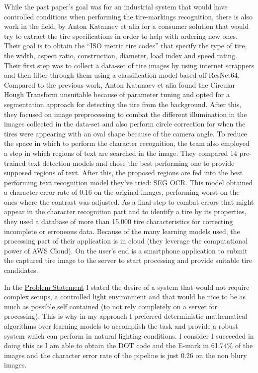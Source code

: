 While the past paper's goal was for an industrial system that would have controlled conditions when performing the tire-markings recognition, there is also work in the field, by Anton Katanaev et alia \cite{site:0} for a consumer solution that would try to extract the tire specifications in order to help with ordering new ones. Their goal is to obtain the “ISO metric tire codes” that specify the type of tire, the width, aspect ratio, construction, diameter, load index and speed rating. Their first step was to collect a data-set of tire images by using internet scrappers and then filter through them using a classification model based off ResNet64. Compared to the previous work, Anton Katanaev et alia found the Circular Hough Transform unsuitable because of parameter tuning and opted for a segmentation approach for detecting the tire from the background. After this, they focused on image preprocessing to combat the different illumination in the images collected in the data-set and also perform circle correction for when the tires were appearing with an oval shape because of the camera angle. To reduce the space in which to perform the character recognition, the team also employed a step in which regions of text are searched in the image. They compared 14 pre-trained text detection models and chose the best performing one to provide supposed regions of text. After this, the proposed regions are fed into the best performing text recognition model they've tried: SEG OCR. This model obtained a character error rate of 0.16 on the original images, performing worst on the ones where the contrast was adjusted. As a final step to combat errors that might appear in the character recognition part and to identify a tire by its properties, they used a database of more than 15,000 tire characteristics for correcting incomplete or erroneous data. Because of the many learning models used, the processing part of their application is in cloud (they leverage the computational power of AWS Cloud). On the user's end is a smartphone application to submit the captured tire image to the server to start processing and provide suitable tire candidates.

In the \hyperref[sec:problem-statement]{Problem Statement} I stated the desire of a system that would not require complex setups, a controlled light environment and that would be nice to be as much as possible self contained (to not rely completely on a server for processing). This is why in my approach I preferred deterministic mathematical algorithms over learning models to accomplish the task and provide a robust system which can perform in natural lighting conditions. I consider I succeeded in doing this as I am able to obtain the DOT code and the E-mark in 61.74\% of the images and the character error rate of the pipeline is just 0.26 on the non blury images.